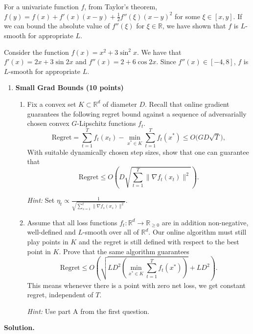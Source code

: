 \documentclass[11pt,letterpaper]{article}
\theoremstyle{definition}
\newcommand{\reals}{\mathbb{R}}
\newcommand{\solution}{\medskip\noindent\textbf{Solution.}\par\medskip}
\begin{document}
For a univariate function $f$, from Taylor's theorem, $f(y) = f(x) + f'(x)(x-y) + \frac{1}{2}f''(\xi)(x-y)^2$ for some $\xi\in [x,y]$.
If we can bound the absolute value of $f''(\xi)$ for $\xi\in \reals$, we have shown that $f$ is $L$-smooth for appropriate $L$.

Consider the function $f(x) = x^2 + 3\sin^2x$. We have that $f'(x) = 2x + 3\sin 2x$ and $f''(x) = 2 + 6 \cos 2x $.
Since $f''(x)\in [-4,8]$, $f$ is $L$-smooth for appropriate $L$.



\begin{enumerate}[resume=q]
\item \textbf{Small Grad Bounds (10 points)}
\begin{enumerate}[label=\textbf{Part \Alph*.}, leftmargin=*]
\item Fix a convex set $K \subset \reals^d$ of diameter $D$. Recall that online gradient guarantees the following regret bound against a sequence of adversarially chosen convex $G$-Lipschitz functions $f_t$.
\[
\mathrm{Regret} = \sum_{t=1}^T f_t(x_t) - \min_{x^* \in K} \sum_{t=1}^T f_t(x^*) \leq O\bigl(GD\sqrt{T}\bigr),
\]
With suitable dynamically chosen step sizes, show that one can guarantee that
\[
\mathrm{Regret} \leq O\left(D\sqrt{\sum_{t=1}^T \|\nabla f_t(x_t)\|^2}\right).
\]

\emph{Hint:} Set $\eta_t \propto \frac{1}{\sqrt{\sum_{s=1}^t \|\nabla f_s(x_s)\|^2}}$.
\item Assume that all loss functions $f_t : \reals^d \to \reals_{\geq 0}$ are in addition non-negative, well-defined and $L$-smooth over all of $\reals^d$. Our online algorithm must still play points in $K$ and the regret is still defined with respect to the best point in $K$. Prove that the same algorithm guarantees
\[
\mathrm{Regret} \leq O\left(\sqrt{LD^2\left(\min_{x^* \in K} \sum_{t=1}^T f_t(x^*)\right)} + LD^2\right).
\]
This means whenever there is a point with zero net loss, we get constant regret, independent of $T$.

\emph{Hint:} Use part A from the first question.
\end{enumerate}
\end{enumerate}

\solution
\end{document}
